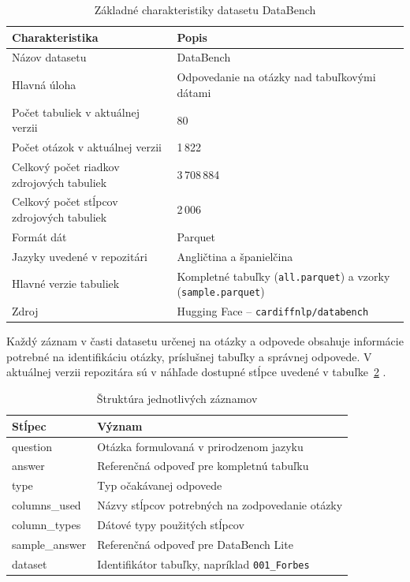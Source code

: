 \begin{table}[htbp]
\centering
\caption{Základné charakteristiky datasetu DataBench}
\label{tab:basic}
\begin{tabularx}{\textwidth}{@{}>{\raggedright\arraybackslash}p{6cm} X@{}}
\toprule
\textbf{Charakteristika} & \textbf{Popis} \\
\midrule
Názov datasetu & DataBench \\
Hlavná úloha & Odpovedanie na otázky nad tabuľkovými dátami \\
Počet tabuliek v aktuálnej verzii & 80 \\
Počet otázok v aktuálnej verzii & 1\,822 \\
Celkový počet riadkov zdrojových tabuliek & 3\,708\,884 \\
Celkový počet stĺpcov zdrojových tabuliek & 2\,006 \\
Formát dát & Parquet \\
Jazyky uvedené v repozitári & Angličtina a španielčina \\
Hlavné verzie tabuliek & Kompletné tabuľky (\texttt{all.parquet}) a vzorky (\texttt{sample.parquet}) \\
Zdroj & Hugging Face -- \texttt{cardiffnlp/databench} \\
\bottomrule
\end{tabularx}
\end{table}

Každý záznam v časti datasetu určenej na otázky a odpovede obsahuje informácie potrebné na identifikáciu otázky, príslušnej tabuľky a správnej odpovede. V aktuálnej verzii repozitára sú v náhľade dostupné stĺpce uvedené v tabuľke~\ref{tab:structure} \cite{hfdatabench}.

\begin{table}[htbp]
\centering
\caption{Štruktúra jednotlivých záznamov}
\label{tab:structure}
\begin{tabularx}{\textwidth}{@{}>{\ttfamily\raggedright\arraybackslash}p{4cm} X@{}}
\toprule
\textbf{Stĺpec} & \textbf{Význam} \\
\midrule
question & Otázka formulovaná v prirodzenom jazyku \\
answer & Referenčná odpoveď pre kompletnú tabuľku \\
type & Typ očakávanej odpovede \\
columns\_used & Názvy stĺpcov potrebných na zodpovedanie otázky \\
column\_types & Dátové typy použitých stĺpcov \\
sample\_answer & Referenčná odpoveď pre DataBench Lite \\
dataset & Identifikátor tabuľky, napríklad \texttt{001\_Forbes} \\
\bottomrule
\end{tabularx}
\end{table}


